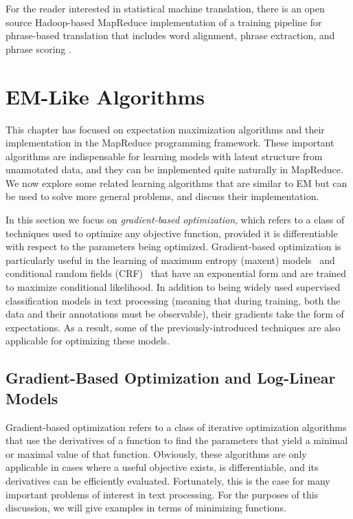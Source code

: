 For the reader interested in statistical machine translation, there is
an open source Hadoop-based MapReduce implementation of a training
pipeline for phrase-based translation that includes word alignment,
phrase extraction, and phrase scoring \cite{Gao_2010}.

\section{EM-Like Algorithms}
\label{chapter6_variants}

This chapter has focused on expectation maximization algorithms and
their implementation in the MapReduce programming framework.  These
important algorithms are indispensable for learning models with latent
structure from unannotated data, and they can be implemented quite
naturally in MapReduce.  We now explore some related learning
algorithms that are similar to EM but can be used to solve more
general problems, and discuss their implementation.

In this section we focus on \emph{gradient-based optimization}, which
refers to a class of techniques used to optimize any objective
function, provided it is differentiable with respect to the parameters
being optimized.  Gradient-based optimization is particularly useful
in the learning of maximum entropy (maxent) models~\cite{Nigam_1999}
and conditional random fields (CRF)~\cite{Lafferty_2001} that have an
exponential form and are trained to maximize conditional likelihood.
In addition to being widely used supervised classification models in
text processing (meaning that during training, both the data and their
annotations must be observable), their gradients take the form of
expectations.  As a result, some of the previously-introduced
techniques are also applicable for optimizing these models.

\subsection{Gradient-Based Optimization and Log-Linear Models}

Gradient-based optimization refers to a class of iterative
optimization algorithms that use the derivatives of a function to find
the parameters that yield a minimal or maximal value of that function.
Obviously, these algorithms are only applicable in cases where a
useful objective exists, is differentiable, and its derivatives can be
efficiently evaluated.  Fortunately, this is the case for many
important problems of interest in text processing.  For the purposes
of this discussion, we will give examples in terms of minimizing
functions.

